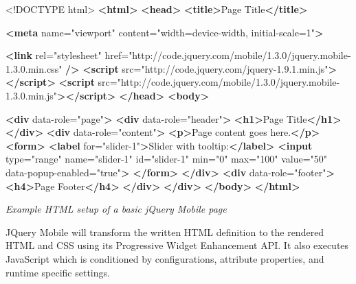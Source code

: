 \documentclass[9pt]{book}
\newenvironment{Shaded}{}{}
\newcommand{\KeywordTok}[1]{\textcolor[rgb]{0.00,0.44,0.13}{\textbf{{#1}}}}
\newcommand{\DataTypeTok}[1]{\textcolor[rgb]{0.56,0.13,0.00}{{#1}}}
\newcommand{\StringTok}[1]{\textcolor[rgb]{0.25,0.44,0.63}{{#1}}}
\newcommand{\OtherTok}[1]{\textcolor[rgb]{0.00,0.44,0.13}{{#1}}}
\newcommand{\NormalTok}[1]{{#1}}
\begin{document}
\begin{Shaded}
\begin{Highlighting}[]
\DataTypeTok{<!DOCTYPE }\NormalTok{html}\DataTypeTok{>}
\KeywordTok{<html>}
\KeywordTok{<head>}
    \KeywordTok{<title>}\NormalTok{Page Title}\KeywordTok{</title>}

    \KeywordTok{<meta}\OtherTok{ name=}\StringTok{"viewport"}\OtherTok{ content=}\StringTok{"width=device-width, initial-scale=1"}\KeywordTok{>}

    \KeywordTok{<link}\OtherTok{ rel=}\StringTok{"stylesheet"}\OtherTok{ href=}\StringTok{"http://code.jquery.com/mobile/1.3.0/jquery.mobile-1.3.0.min.css"} \KeywordTok{/>}
    \KeywordTok{<script}\OtherTok{ src=}\StringTok{"http://code.jquery.com/jquery-1.9.1.min.js"}\KeywordTok{></script>}
    \KeywordTok{<script}\OtherTok{ src=}\StringTok{"http://code.jquery.com/mobile/1.3.0/jquery.mobile-1.3.0.min.js"}\KeywordTok{></script>}
\KeywordTok{</head>}
\KeywordTok{<body>}

\KeywordTok{<div}\OtherTok{ data-role=}\StringTok{"page"}\KeywordTok{>}
  \KeywordTok{<div}\OtherTok{ data-role=}\StringTok{"header"}\KeywordTok{>}
    \KeywordTok{<h1>}\NormalTok{Page Title}\KeywordTok{</h1>}
  \KeywordTok{</div>}
  \KeywordTok{<div}\OtherTok{ data-role=}\StringTok{"content"}\KeywordTok{>}
     \KeywordTok{<p>}\NormalTok{Page content goes here.}\KeywordTok{</p>}
     \KeywordTok{<form>}
       \KeywordTok{<label}\OtherTok{ for=}\StringTok{"slider-1"}\KeywordTok{>}\NormalTok{Slider with tooltip:}\KeywordTok{</label>}
       \KeywordTok{<input}\OtherTok{ type=}\StringTok{"range"}\OtherTok{ name=}\StringTok{"slider-1"}\OtherTok{ id=}\StringTok{"slider-1"}\OtherTok{ min=}\StringTok{"0"}\OtherTok{ max=}\StringTok{"100"}\OtherTok{ value=}\StringTok{"50"} 
\OtherTok{        data-popup-enabled=}\StringTok{"true"}\KeywordTok{>}
     \KeywordTok{</form>}
  \KeywordTok{</div>}
  \KeywordTok{<div}\OtherTok{ data-role=}\StringTok{"footer"}\KeywordTok{>}
     \KeywordTok{<h4>}\NormalTok{Page Footer}\KeywordTok{</h4>}
  \KeywordTok{</div>}
\KeywordTok{</div>}
\KeywordTok{</body>}
\KeywordTok{</html>}
\end{Highlighting}
\end{Shaded}

\emph{Example HTML setup of a basic jQuery Mobile page}

JQuery Mobile will transform the written HTML definition to the rendered
HTML and CSS using its Progressive Widget Enhancement API. It also
executes JavaScript which is conditioned by configurations, attribute
properties, and runtime specific settings.
\end{document}
